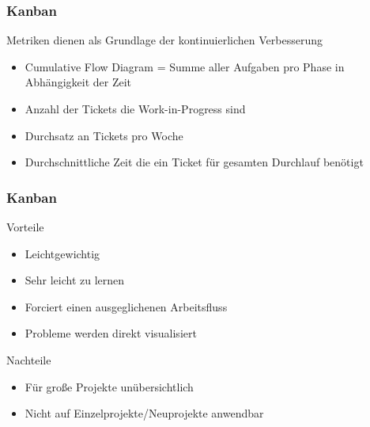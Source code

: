 \begin{frame}
\frametitle{Kanban}
	Metriken dienen als Grundlage der kontinuierlichen Verbesserung
	\begin{itemize}
		\item Cumulative Flow Diagram = Summe aller Aufgaben pro Phase in Abhängigkeit der Zeit
		\item Anzahl der Tickets die Work-in-Progress sind
		\item Durchsatz an Tickets pro Woche
		\item Durchschnittliche Zeit die ein Ticket für gesamten Durchlauf benötigt
	\end{itemize}
\end{frame}

\begin{frame}
\frametitle{Kanban}
	Vorteile
	\begin{itemize}
		\item Leichtgewichtig
		\item Sehr leicht zu lernen
		\item Forciert einen ausgeglichenen Arbeitsfluss
		\item Probleme werden direkt visualisiert
	\end{itemize}
	\bigskip
	Nachteile
	\begin{itemize}
		\item Für große Projekte unübersichtlich
		\item Nicht auf Einzelprojekte/Neuprojekte anwendbar
	\end{itemize}
\end{frame}
